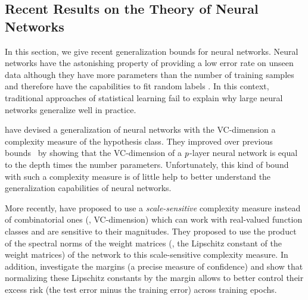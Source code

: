 

\subsection{Recent Results on the Theory of Neural Networks}
\label{subsection:ch2-recent_results_on_the_theory_of_neural_networks}

In this section, we give recent generalization bounds for neural networks.
Neural networks have the astonishing property of providing a low error rate on unseen data although they have more parameters than the number of training samples and therefore have the capabilities to fit random labels \cite{zhang2016understanding}. 
In this context, traditional approaches of statistical learning  fail to explain why large neural networks generalize well in practice.

\citet{harvey2017nearly} have devised a generalization of neural networks with the VC-dimension a complexity measure of the hypothesis class.
They improved over previous bounds~\cite{bartlett1998almost} by showing that the VC-dimension of a $p$-layer neural network is equal to the depth times the number parameters.
Unfortunately, this kind of bound with such a complexity measure is of little help to better understand the generalization capabilities of neural networks. 

More recently, \citet{bartlett2017spectrally} have proposed to use a \emph{scale-sensitive} complexity measure instead of combinatorial ones (\ie, VC-dimension) which can work with real-valued function classes and are sensitive to their magnitudes. 
They proposed to use the product of the spectral norms of the weight matrices (\ie, the Lipschitz constant of the weight matrices) of the network to this scale-sensitive complexity measure.
In addition, \citeauthor{bartlett2017spectrally} investigate the margins (a precise measure of confidence) and show that normalizing these Lipschitz constants by the margin allows to better control their excess risk (the test error minus the training error) across
training epochs.

